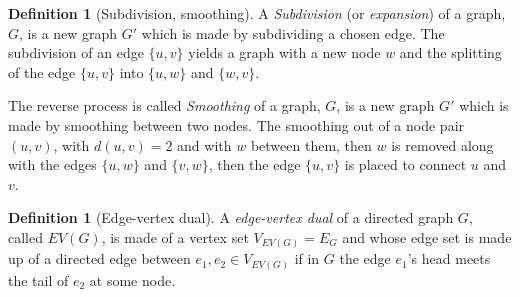 \documentclass[a4paper,10pt]{article}
\theoremstyle{definition}
\newtheorem{definition}[theorem]{Definition}
\theoremstyle{definition}
\theoremstyle{remark}
\theoremstyle{definition}
\begin{document}
\begin{definition}[Subdivision, smoothing]
A \textit{Subdivision} (or \textit{expansion}) of a graph, $G$, is a new graph $G'$ which is made by subdividing a chosen edge. The subdivision of an edge $\{u,v\}$ yields a graph with a new node $w$ and the splitting of the edge $\{u,v\}$ into $\{u,w\}$ and $\{w,v\}$.

The reverse process is called \textit{Smoothing} of a graph, $G$, is a new graph $G'$ which is made by smoothing between two nodes. The smoothing out of a node pair $(u,v)$, with $d(u,v)=2$ and with $w$ between them, then $w$ is removed along with the edges $\{u,w\}$ and $\{v,w\}$, then the edge $\{u,v\}$ is placed to connect $u$ and $v$. 
\end{definition}

\begin{myfigure}
\begin{center}
\caption{Subdivision and Smoothing of the edge $\{1,2\}$}
\end{center}
\end{myfigure}

\begin{definition}[Edge-vertex dual]
A \textit{edge-vertex dual} of a directed graph $G$, called $EV(G)$, is made of a vertex set $V_{EV(G)}=E_{G}$ and whose edge set is made up of a directed edge between $e_{1},e_{2} \in V_{EV(G)}$ if in $G$ the edge $e_{1}$'s head meets the tail of $e_{2}$ at some node.
\end{definition}
\end{document}
